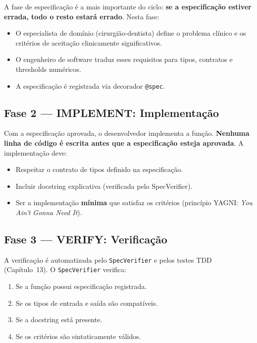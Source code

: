 A fase de especificação é a mais importante do ciclo: \textbf{se a
especificação estiver errada, todo o resto estará errado}. Nesta fase:

\begin{itemize}
  \item O especialista de domínio (cirurgião-dentista) define o problema
    clínico e os critérios de aceitação clinicamente significativos.
  \item O engenheiro de software traduz esses requisitos para tipos,
    contratos e thresholds numéricos.
  \item A especificação é registrada via decorador \texttt{@spec}.
\end{itemize}

\subsection{Fase 2 — IMPLEMENT: Implementação}

Com a especificação aprovada, o desenvolvedor implementa a função.
\textbf{Nenhuma linha de código é escrita antes que a especificação
esteja aprovada}. A implementação deve:

\begin{itemize}
  \item Respeitar o contrato de tipos definido na especificação.
  \item Incluir docstring explicativa (verificada pelo SpecVerifier).
  \item Ser a implementação \textbf{mínima} que satisfaz os critérios
    (princípio YAGNI: \textit{You Ain't Gonna Need It}).
\end{itemize}

\subsection{Fase 3 — VERIFY: Verificação}

A verificação é automatizada pelo \texttt{SpecVerifier} e pelos testes
TDD (Capítulo~13). O \texttt{SpecVerifier} verifica:

\begin{enumerate}
  \item Se a função possui especificação registrada.
  \item Se os tipos de entrada e saída são compatíveis.
  \item Se a docstring está presente.
  \item Se os critérios são sintaticamente válidos.
\end{enumerate}


